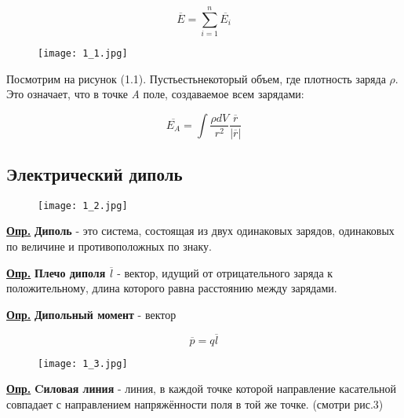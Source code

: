 \begin{equation}\label{opr3}
\overline{E} = \sum\limits_{i=1}^n \overline{E_{i}}
\end{equation}

\begin{figure}[!ht]
\centering
 \texttt{[image: 1\_1.jpg]}     
 \label{fig:my_label}
 \caption{}
\end{figure}

Посмотрим на рисунок (1.1). Пустьестьнекоторый объем, где плотность заряда $\rho$. Это означает, что в точке \textit{A} поле, создаваемое всем зарядами:

\begin{equation}\label{opr4}
\overline{E_{A}} = \int \frac{\rho dV}{r^2} \frac{\overline{r}}{|\overline{r}|}
\end{equation}

\subsection{Электрический диполь}

\begin{figure}[!ht]
\centering
 \texttt{[image: 1\_2.jpg]}     
 \label{fig:my_label}
 \caption{}
\end{figure}

\colorbox{faded}{\underline{\textbf{Опр.}}} \textbf{Диполь} - это система, состоящая из  двух одинаковых зарядов, одинаковых по величине и противоположных по знаку.

\colorbox{faded}{\underline{\textbf{Опр.}}} \textbf{Плечо диполя $\overline{l}$} - вектор, идущий от отрицательного заряда к положительному, длина которого равна расстоянию между зарядами.

\colorbox{faded}{\underline{\textbf{Опр.}}} \textbf{Дипольный момент} - вектор 

\begin{equation}\label{opr5}
\overline{p} =q \overline{l}
\end{equation}

\begin{figure}[!ht]
\centering
 \texttt{[image: 1\_3.jpg]}     
 \label{fig:my_label}
 \caption{}
\end{figure}

\colorbox{faded}{\underline{\textbf{Опр.}}} \textbf{Cиловая линия} - линия, в каждой точке которой направление касательной совпадает с направлением напряжённости поля в той же точке. (смотри рис.3)

